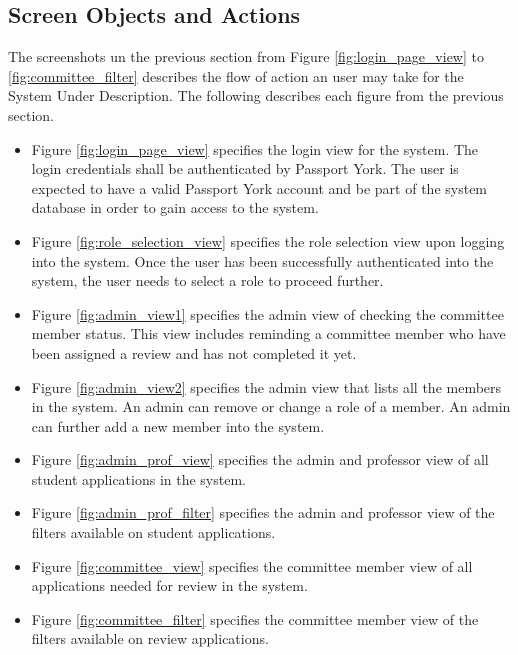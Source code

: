 \documentclass[fontsize=12pt,paper=letter,twoside]{scrartcl}
\begin{document}
\clearpage
\newpage
\subsection{Screen Objects and Actions}

The screenshots un the previous section from Figure \ref{fig:login_page_view} to \ref{fig:committee_filter} describes the flow of action an user may take for the System Under Description. The following describes each figure from the previous section.

\begin{itemize}
\item Figure \ref{fig:login_page_view} specifies the login view for the system. The login credentials shall be authenticated by Passport York. The user is expected to have a valid Passport York account and be part of the system database in order to gain access to the system.
\item Figure \ref{fig:role_selection_view} specifies the role selection view upon logging into the system. Once the user has been successfully authenticated into the system, the user needs to select a role to proceed further.
\item Figure \ref{fig:admin_view1} specifies the admin view of checking the committee member status. This view includes reminding a committee member who have been assigned a review and has not completed it yet.
\item Figure \ref{fig:admin_view2} specifies the admin view that lists all the members in the system. An admin can remove or change a role of a member. An admin can further add a new member into the system.
\item Figure \ref{fig:admin_prof_view} specifies the admin and professor view of all student applications in the system.
\item Figure \ref{fig:admin_prof_filter} specifies the admin and professor view of the filters available on student applications.
\item Figure \ref{fig:committee_view} specifies the committee member view of all applications needed for review in the system.
\item Figure \ref{fig:committee_filter} specifies the committee member view of the filters available on review applications.
\end{itemize}

\end{document}
